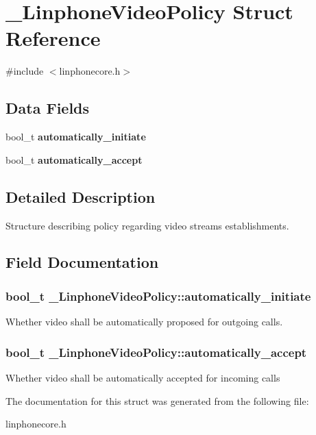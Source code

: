 \section{\-\_\-\-Linphone\-Video\-Policy Struct Reference}
\label{struct__LinphoneVideoPolicy}


{\ttfamily \#include $<$linphonecore.\-h$>$}

\subsection*{Data Fields}
\begin{DoxyCompactItemize}
\item 
bool\-\_\-t {\bf automatically\-\_\-initiate}
\item 
bool\-\_\-t {\bf automatically\-\_\-accept}
\end{DoxyCompactItemize}


\subsection{Detailed Description}
Structure describing policy regarding video streams establishments. 

\subsection{Field Documentation}
\subsubsection[{automatically\-\_\-initiate}]{\setlength{\rightskip}{0pt plus 5cm}bool\-\_\-t \-\_\-\-Linphone\-Video\-Policy\-::automatically\-\_\-initiate}\label{struct__LinphoneVideoPolicy_af2844cb3185be244283d0dd310a0d7c9}
Whether video shall be automatically proposed for outgoing calls. 
\subsubsection[{automatically\-\_\-accept}]{\setlength{\rightskip}{0pt plus 5cm}bool\-\_\-t \-\_\-\-Linphone\-Video\-Policy\-::automatically\-\_\-accept}\label{struct__LinphoneVideoPolicy_ae94ea7330374ad7aebbddde76b13f0e4}
Whether video shall be automatically accepted for incoming calls 

The documentation for this struct was generated from the following file\-:\begin{DoxyCompactItemize}
\item 
linphonecore.\-h\end{DoxyCompactItemize}
